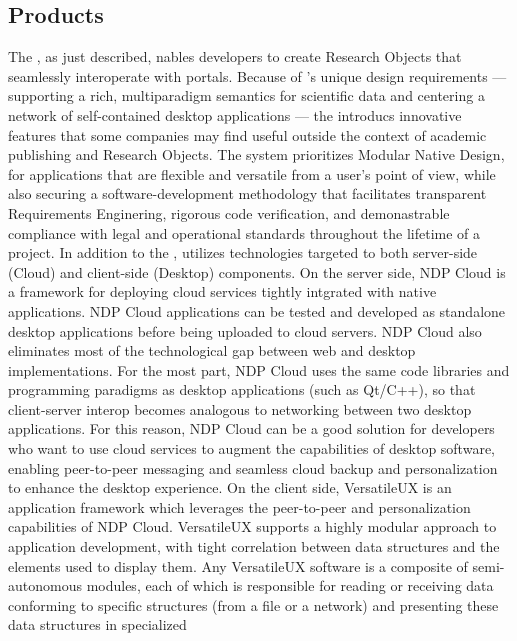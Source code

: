 \documentclass[11pt,letterpaper]{article}
\begin{document}
\subsection{{\lMOSAIC} Products}
The {\MOSAIC} {\SDK}, as just described, nables 
developers to create Research Objects that 
seamlessly interoperate with {\MOSAIC} 
portals.  Because of {\MOSAIC}'s unique design 
requirements --- supporting a 
rich, multiparadigm semantics for scientific data 
and centering a network of self-contained 
desktop applications --- the {\MOSAIC} {\SDK} 
introducs innovative features that some companies may 
find useful outside the context of academic 
publishing and Research Objects.  
The {\MOSAIC} system  
prioritizes Modular Native Design, for applications 
that are flexible and versatile 
from a user's point of view, 
while also securing a software-development methodology 
that facilitates transparent Requirements 
Enginering, rigorous code verification, 
and demonastrable compliance with 
legal and operational standards throughout the 
lifetime of a project.
\p{}
In addition to the {\SDK}, {\MOSAIC} utilizes technologies 
targeted to both server-side (Cloud) 
and client-side (Desktop) components.  On the 
server side, NDP Cloud is a framework for deploying 
cloud services tightly intgrated with native applications.  
NDP Cloud applications can be tested and 
developed as standalone desktop applications before 
being uploaded to cloud servers.  
NDP Cloud also eliminates most of the technological 
gap between web and desktop implementations.  
For the most part, NDP Cloud uses the same code libraries 
and programming paradigms as 
desktop applications (such as Qt/C++), 
so that client-server interop 
becomes analogous to networking between two 
desktop applications.  For this reason, NDP Cloud 
can be a good solution for developers who want to 
use cloud services to augment the capabilities 
of desktop software, enabling peer-to-peer 
messaging and seamless cloud backup and 
personalization to enhance the desktop experience.
\p{}
On the client side, VersatileUX is an {\GUI} 
application framework which leverages 
the peer-to-peer and personalization 
capabilities of NDP Cloud.  VersatileUX 
supports a highly modular approach to 
application development, with tight 
correlation between data structures and the {\GUI} 
elements used to display them.  Any VersatileUX 
software is a composite of semi-autonomous  
modules, each of which is responsible for 
reading or receiving data conforming 
to specific structures (from a file or a network) 
and presenting these data structures in specialized 
\end{document}
